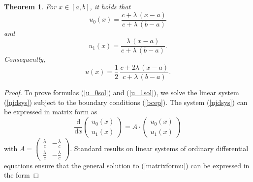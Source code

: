 \documentclass{article}
\newtheorem{thm}{Theorem}
\begin{document}
\begin{thm}\label{thm1}For $x\in[a,b]$, it holds that 
\begin{equation}u_0(x)=\frac{c+\lambda\,(x-a)}{c+\lambda\,(b-a)}\label{u_0sol}\end{equation}
and
\begin{equation}u_1(x)=\frac{\lambda\,(x-a)}{c+\lambda\,(b-a)}.\label{u_1sol}\end{equation}
Consequently,
\begin{equation}u(x)=\frac{1}{2}\,\frac{c+2\lambda\,(x-a)}{c+\lambda\,(b-a)}.\label{u_totsol}\end{equation}
\end{thm}
\begin{proof}To prove formulas (\ref{u_0sol}) and (\ref{u_1sol}), we solve the linear system (\ref{ujdsys}) subject to the boundary conditions (\ref{bcep}). The system (\ref{ujdsys}) can be expressed in matrix form as
\begin{equation}\frac{\mathrm{d}}{\mathrm{d} x}\begin{pmatrix}u_0(x)\\u_1(x)\end{pmatrix}=A\cdot\begin{pmatrix}u_0(x)\\u_1(x)\end{pmatrix}\label{matrixformu}\end{equation} with $A=\begin{pmatrix}\frac{\lambda}{c} & -\frac{\lambda}{c}\\[0.5em]\frac{\lambda}{c} & -\frac{\lambda}{c}\end{pmatrix}.$
 Standard results on linear systems of ordinary differential equations ensure that the general solution to (\ref{matrixformu}) can be expressed in the form 

\end{proof}
\end{document}

